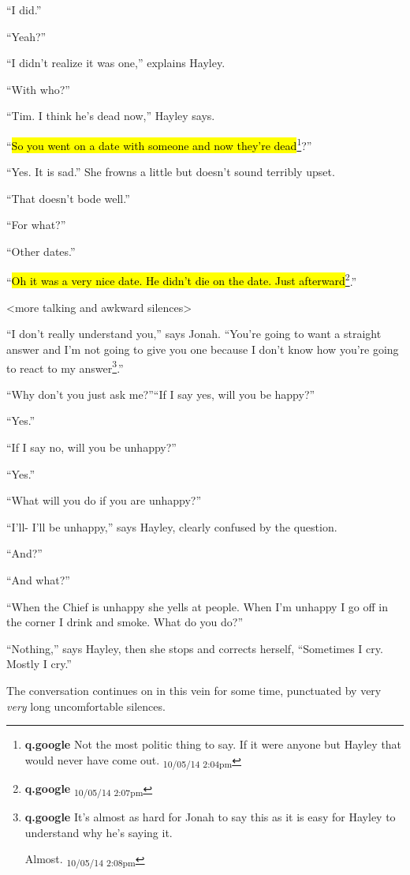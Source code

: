 ``I did.''

``Yeah?''

``I didn't realize it was one,'' explains Hayley.

``With who?''

``Tim.  I think he's dead now,'' Hayley says.  

``\hl{So you went on a date with someone and now they're dead}\footnote{\textbf{q.google }Not the most politic thing to say.  If it were anyone but Hayley that would never have come out. \textsubscript{10/05/14 2:04pm}}?''

``Yes. It is sad.''  She frowns a little but doesn't sound terribly upset.

``That doesn't bode well.''

``For what?''

``Other dates.''

``\hl{Oh it was a very nice date.  He didn't die on the date.  Just afterward}\footnote{\textbf{q.google } \textsubscript{10/05/14 2:07pm}}.''

\textless more talking and awkward silences\textgreater 

``I don't really understand you,'' says Jonah.  ``You're going to want a straight answer and I'm not going to give you one because I don't know how you're going to react to my answer\footnote{\textbf{q.google }It's almost as hard for Jonah to say this as it is easy for Hayley to understand why he's saying it.

Almost. \textsubscript{10/05/14 2:08pm}}.''

``Why don't you just ask me?''``If I say yes, will you be happy?''

``Yes.''

``If I say no, will you be unhappy?''

``Yes.''

``What will you do if you are unhappy?''

``I'll- I'll be unhappy,'' says Hayley, clearly confused by the question.

``And?''

``And what?''

``When the Chief is unhappy she yells at people.  When I'm unhappy I go off in the corner I drink and smoke. What do you do?''

``Nothing,'' says Hayley, then she stops and corrects herself, ``Sometimes I cry.  Mostly I cry.''

The conversation continues on in this vein for some time, punctuated by very \textit{very }long uncomfortable silences.   

